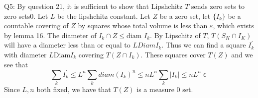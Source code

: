\documentclass[letterpaper]{article}
\DeclareMathOperator{\ep}{\varepsilon}
\begin{document}
\noindent Q5: By question 21, it is sufficient to show that Lipshchitz $T$ sends zero sets to zero sets0. Let $L$ be the lipshchitz constant. Let $Z$ be a zero set, let $\{I_k\}$ be a countable covering of $Z$ by squares whose total volume is less than $\varepsilon$, which exists by lemma 16. The diameter of $I_k\cap Z \leq \text{diam } I_k$. By Lipschitz of $T$, $T(S_K\cap  I_K)$ will have a diameter less than or equal to $L Diam I_k$. Thus we can find a square $I^\prime_k$ with diameter $L \text{Diam}I_k$ covering $T(Z\cap I_k)$. These squares cover $T(Z)$ and we see that 
$$\sum_{k}I^\prime_k \leq L^n \sum_{k}diam(I_k)^n \leq nL^n \sum_{k}|I_k| \leq nL^n\ep$$
Since $L,n$ both fixed, we have that $T(Z)$ is a measure 0 set. 
\end{document}
